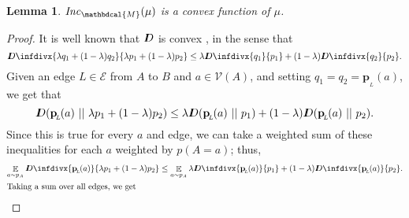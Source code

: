 \documentclass[letterpaper]{article} %
\theoremstyle{plain}
\newtheorem{lemma}[theorem]{Lemma}
\theoremstyle{definition}
\theoremstyle{remark}
\newcommand{\thickD}{I\mkern-8muD}
\newcommand{\kldiv}{\thickD\infdivx}
\DeclareMathOperator*{\E}{\mathbb{E}} %
\newcommand\mat[1]{\mathbf{#1}}
\newcommand{\bp}[1][L]{\mat{p}_{\!_{#1}\!}}
\newcommand{\Ed}{\mathcal E}
\newcommand{\dg}[1]{\mathbdcal{#1}}
\newcommand\Inc{\mathit{Inc}}
\begin{document}
\begin{lemma}
	\label{thm:inc-convex}
	$\Inc_{\dg M}( \mu)$ is a convex function of $\mu$.
\end{lemma}
\begin{proof}
    It is well known that $\thickD$ is convex \cite[Theorem
            2.7.2]{coverThomas}, in the sense that  
	\[ \kldiv{\lambda q_1 + (1-\lambda) q_2 }{ \lambda p_1
			  + (1-\lambda) p_2} \leq \lambda \kldiv {q_1}{ p_1} +
							(1-\lambda) \kldiv{q_2}{p_2}. \] 
Given an edge $L \in \Ed$ from $A$ to $B$ and $a \in \mathcal V(A)$,
and   
setting $q_1 = q_2 = \bp(a)$, we get that
	\[ \thickD(\bp(a) \ ||\ \lambda p_1 + (1-\lambda) p_2)
			\leq \lambda \thickD (\bp(a) \ ||\ p_1) + (1-\lambda)
							\thickD(\bp(a)\ ||\ p_2). \] 
	Since this is true for every $a$ and edge, we can take
		   a weighted sum of these inequalities for each $a$
		   weighted by $p(A=a)$; thus, 
	\begin{align*}
		\E_{a\sim p_A} \kldiv{\bp(a)}{\lambda p_1 +
			(1-\lambda) p_2} &\leq 
			 \E_{a\sim p_A}\lambda \kldiv {\bp(a)}{p_1} +
											(1-\lambda)
                         			 \kldiv{\bp(a)}{p_2}. \\
                        \intertext{Taking a sum over all edges, we get
}
\end{align*}
\end{proof}
\end{document}
